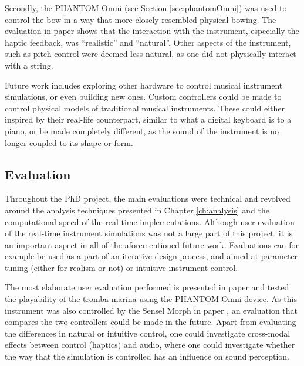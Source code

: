 Secondly, the PHANTOM Omni (see Section \ref{sec:phantomOmni}) was used to control the bow in a way that more closely resembled physical bowing. The evaluation in paper \citeP[E] shows that the interaction with the instrument, especially the haptic feedback, was ``realistic'' and ``natural''. Other aspects of the instrument, such as pitch control were deemed less natural, as one did not physically interact with a string. 

Future work includes exploring other hardware to control musical instrument simulations, or even building new ones. Custom controllers could be made to control physical models of traditional musical instruments. 
These could either inspired by their real-life counterpart, similar to what a digital keyboard is to a piano, or be made completely different, as the sound of the instrument is no longer coupled to its shape or form.




\subsection{Evaluation}
Throughout the PhD project, the main evaluations were technical and revolved around the analysis techniques presented in Chapter \ref{ch:analysis} and the computational speed of the real-time implementations.
Although user-evaluation of the real-time instrument simulations was not a large part of this project, it is an important aspect in all of the aforementioned future work. Evaluations can for example be used as a part of an iterative design process, and aimed at parameter tuning (either for realism or not) or intuitive instrument control.

The most elaborate user evaluation performed is presented in paper \citeP[E] and tested the playability of the tromba marina using the PHANTOM Omni device. As this instrument was also controlled by the Sensel Morph in paper \citeP[D], an evaluation that compares the two controllers could be made in the future. Apart from evaluating the differences in natural or intuitive control, one could investigate cross-modal effects between control (haptics) and audio, where one could investigate whether the way that the simulation is controlled has an influence on sound perception.

